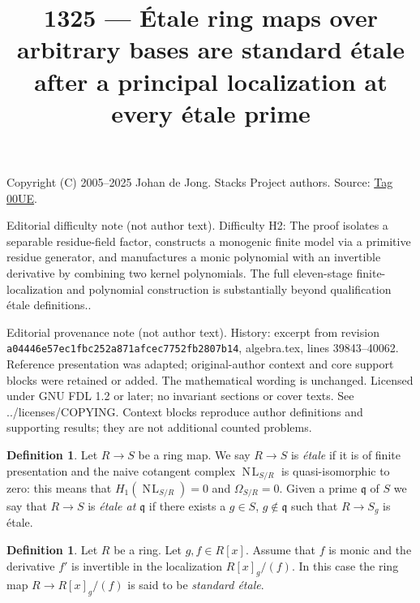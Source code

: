 \documentclass{amsart}
\theoremstyle{plain}
\theoremstyle{definition}
\newtheorem{definition}[subsection]{Definition}
\theoremstyle{remark}
\numberwithin{equation}{subsection}
\def\NL{\mathop{N\!L}\nolimits}
\begin{document}
\title[Stacks Project, Tag 00UE]{1325 --- Étale ring maps over arbitrary bases are standard étale after a principal localization at every étale prime}
\maketitle
\noindent Copyright (C) 2005--2025 Johan de Jong. Stacks Project authors. Source: \href{https://stacks.math.columbia.edu/tag/00UE}{Tag 00UE}.

\noindent Editorial difficulty note (not author text). Difficulty H2: The proof isolates a separable residue-field factor, constructs a monogenic finite model via a primitive residue generator, and manufactures a monic polynomial with an invertible derivative by combining two kernel polynomials. The full eleven-stage finite-localization and polynomial construction is substantially beyond qualification étale definitions..

\noindent Editorial provenance note (not author text). History: excerpt from revision \texttt{a0444\allowbreak 6e57e\allowbreak c1fbc\allowbreak 252a8\allowbreak 71afc\allowbreak ec775\allowbreak 2fb28\allowbreak 07b14}, algebra.tex, lines 39843--40062. Reference presentation was adapted; original-author context and core support blocks were retained or added. The mathematical wording is unchanged. Licensed under GNU FDL 1.2 or later; no invariant sections or cover texts. See ../licenses/COPYING. Context blocks reproduce author definitions and supporting results; they are not additional counted problems.

\begin{definition}
\label{definition-etale}
Let $R \to S$ be a ring map. We say $R \to S$ is {\it \'etale} if it is
of finite presentation and the naive cotangent complex
$\NL_{S/R}$ is quasi-isomorphic to zero: this means that $H_1(\NL_{S/R}) = 0$
and $\Omega_{S/R} = 0$. Given a prime $\mathfrak q$
of $S$ we say that $R \to S$ is {\it \'etale at $\mathfrak q$}
if there exists a $g \in S$, $g \not \in \mathfrak q$ such that
$R \to S_g$ is \'etale.
\end{definition}

\begin{definition}
\label{definition-standard-etale}
Let $R$ be a ring. Let $g , f  \in R[x]$.
Assume that $f$ is monic and the derivative $f'$ is invertible in
the localization $R[x]_g/(f)$.
In this case the ring map $R \to R[x]_g/(f)$ is said to be
{\it standard \'etale}.
\end{definition}
\end{document}
